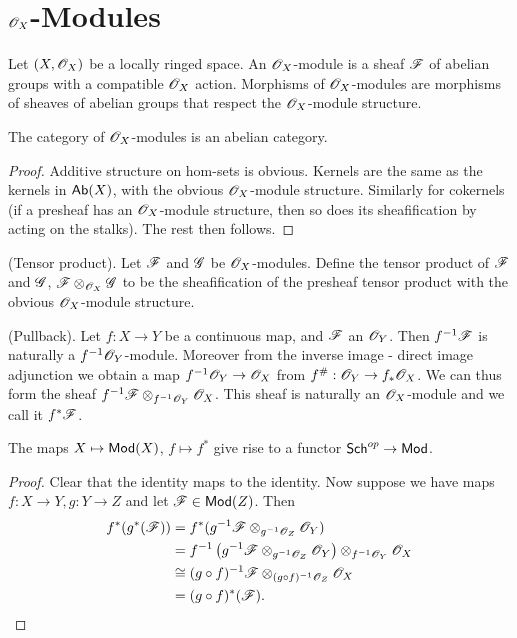 \documentclass{memoir}
\begin{document}
\section{\texorpdfstring{$\mathscr{O}_X$}{OX}-Modules}
\begin{definition}
    Let $(X,\mathscr{O}_X)$ be a locally ringed space.
    An $\mathscr{O}_X$-module is a sheaf $\mathscr{F}$ of abelian groups with a compatible $\mathscr{O}_X$ action.
    Morphisms of $\mathscr{O}_X$-modules are morphisms of sheaves of abelian groups that respect the $\mathscr{O}_X$-module structure.
\end{definition}
\begin{thm}
    The category of $\mathscr{O}_X$-modules is an abelian category.
\end{thm}
\begin{proof}
    Additive structure on hom-sets is obvious.
    Kernels are the same as the kernels in ${\normalfont\mathsf{Ab}}(X)$, with the obvious $\mathscr{O}_X$-module structure.
    Similarly for cokernels (if a presheaf has an $\mathscr{O}_X$-module structure, then so does its sheafification by acting on the stalks).
    The rest then follows.
\end{proof}
\begin{definition}
    (Tensor product).
    Let $\mathscr{F}$ and $\mathscr{G}$ be $\mathscr{O}_X$-modules.
    Define the tensor product of $\mathscr{F}$ and $\mathscr{G}$, $\mathscr{F}\otimes_{\mathscr{O}_X}\mathscr{G}$ to be the sheafification of the presheaf tensor product with the obvious $\mathscr{O}_X$-module structure.
\end{definition}
\begin{definition}
    (Pullback).
    Let $f:X\to Y$ be a continuous map, and $\mathscr{F}$ an $\mathscr{O}_Y$.
    Then $f^{-1}\mathscr{F}$ is naturally a $f^{-1}\mathscr{O}_Y$-module.
    Moreover from the inverse image - direct image adjunction we obtain a map $f^{-1}\mathscr{O}_Y\to \mathscr{O}_X$ from $f^\#:\mathscr{O}_Y\to f_*\mathscr{O}_X$.
    We can thus form the sheaf $f^{-1}\mathscr{F}\otimes_{f^{-1}\mathscr{O}_Y}\mathscr{O}_X$.
    This sheaf is naturally an $\mathscr{O}_X$-module and we call it $f^*\mathscr{F}$.
\end{definition}
\begin{proposition}
    The maps $X\mapsto {\normalfont\mathsf{Mod}}(X)$, $f\mapsto f^*$ give rise to a functor ${\normalfont\mathsf{Sch}}^{op}\to {\normalfont\mathsf{Mod}}$.
\end{proposition}
\begin{proof}
    Clear that the identity maps to the identity.
    Now suppose we have maps $f:X\to Y,g:Y\to Z$ and let $\mathscr{F}\in {\normalfont\mathsf{Mod}}(Z)$.
    Then
    \begin{align}
        f^*(g^*(\mathscr{F})) &= f^*(g^{-1}\mathscr{F}\otimes_{g^{-1}\mathscr{O}_Z}\mathscr{O}_Y) \nonumber \\
                         &= f^{-1}\left(g^{-1}\mathscr{F}\otimes_{g^{-1}\mathscr{O}_Z}\mathscr{O}_Y\right)\otimes_{f^{-1}\mathscr{O}_Y}\mathscr{O}_X \nonumber \\
                         &\cong (g\circ f)^{-1}\mathscr{F}\otimes_{(g\circ f)^{-1}\mathscr{O}_Z}\mathscr{O}_X \nonumber \\
                         &= (g\circ f)^*(\mathscr{F}).
    \end{align}
\end{proof}
\end{document}
